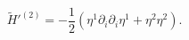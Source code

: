 \begin{equation}
 \tilde{H}'^{(2)}=-\frac{1}{2}(\eta^1\partial_i\partial_i\eta^1+\eta^2\eta^2).
 \label{a50}
 \end{equation}

